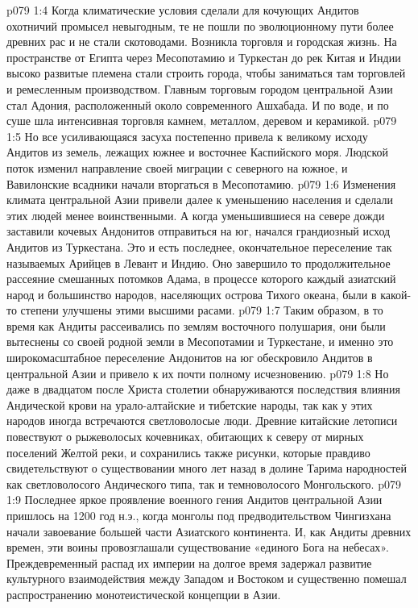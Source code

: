 \vs p079 1:4 Когда климатические условия сделали для кочующих Андитов охотничий промысел невыгодным, те не пошли по эволюционному пути более древних рас и не стали скотоводами. Возникла торговля и городская жизнь. На пространстве от Египта через Месопотамию и Туркестан до рек Китая и Индии высоко развитые племена стали строить города, чтобы заниматься там торговлей и ремесленным производством. Главным торговым городом центральной Азии стал Адония, расположенный около современного Ашхабада. И по воде, и по суше шла интенсивная торговля камнем, металлом, деревом и керамикой.
\vs p079 1:5 Но все усиливающаяся засуха постепенно привела к великому исходу Андитов из земель, лежащих южнее и восточнее Каспийского моря. Людской поток изменил направление своей миграции с северного на южное, и Вавилонские всадники начали вторгаться в Месопотамию.
\vs p079 1:6 Изменения климата центральной Азии привели далее к уменьшению населения и сделали этих людей менее воинственными. А когда уменьшившиеся на севере дожди заставили кочевых Андонитов отправиться на юг, начался грандиозный исход Андитов из Туркестана. Это и есть последнее, окончательное переселение так называемых Арийцев в Левант и Индию. Оно завершило то продолжительное рассеяние смешанных потомков Адама, в процессе которого каждый азиатский народ и большинство народов, населяющих острова Тихого океана, были в какой\hyp{}то степени улучшены этими высшими расами.
\vs p079 1:7 Таким образом, в то время как Андиты рассеивались по землям восточного полушария, они были вытеснены со своей родной земли в Месопотамии и Туркестане, и именно это широкомасштабное переселение Андонитов на юг обескровило Андитов в центральной Азии и привело к их почти полному исчезновению.
\vs p079 1:8 Но даже в двадцатом после Христа столетии обнаруживаются последствия влияния Андической крови на урало\hyp{}алтайские и тибетские народы, так как у этих народов иногда встречаются светловолосые люди. Древние китайские летописи повествуют о рыжеволосых кочевниках, обитающих к северу от мирных поселений Желтой реки, и сохранились также рисунки, которые правдиво свидетельствуют о существовании много лет назад в долине Тарима народностей как светловолосого Андического типа, так и темноволосого Монгольского.
\vs p079 1:9 Последнее яркое проявление военного гения Андитов центральной Азии пришлось на 1200 год н.э., когда монголы под предводительством Чингизхана начали завоевание большей части Азиатского континента. И, как Андиты древних времен, эти воины провозглашали существование «единого Бога на небесах». Преждевременный распад их империи на долгое время задержал развитие культурного взаимодействия между Западом и Востоком и существенно помешал распространению монотеистической концепции в Азии.
